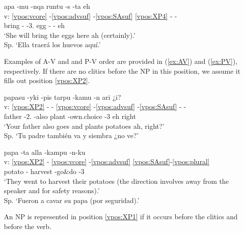 \documentclass[output=paper]{langscibook}
\begin{document}
\ea \label{ex:VP}{
	\glll {} apa -mu -nqa runtu -s -ta eh \\
        v: \ref{vpos:vcore} -\ref{vpos:advsuf} -\ref{vpos:SAsuf} \ref{vpos:XP4} - -  \\
		{} bring -\Dir{} -3\Sg{}.\Fut{} egg -\Pl{} -\Acc{} eh \\
	\glt `She will bring the eggs here ah (certainly).' \\ Sp. `Ella traerá los huevos aquí.'
	\hfill }
\z

Examples of A-V and and P-V order are provided in (\ref{ex:AV}) and (\ref{ex:PV}), respectively. If there are no clitics before the NP in this position, we assume it fills out position \ref{vpos:XP2}. 

\ea \label{ex:AV}{
	\glll {} papasu -yki -pis tarpu -kamu -n ari ¿i? \\
        v: \ref{vpos:XP2} - - \ref{vpos:vcore} -\ref{vpos:advsuf} -\ref{vpos:SAsuf} - - \\
		{} father -2\Sg{}.\Poss{} -also plant -own.choice -3\Sg{} eh right   \\
	\glt `Your father also goes and plants potatoes ah, right?' \\ Sp. `Tu padre también va y siembra ¿no ve?'
	\hfill } 
\z

\ea \label{ex:PV}{
	\glll {} papa -ta alla -kampu -n-ku \\
        v: \ref{vpos:XP2} - \ref{vpos:vcore} -\ref{vpos:advsuf} \ref{vpos:SAsuf}-\ref{vpos:plural} \\
		{} potato -\Acc{} harvest -go\&do -3\Pl{}  \\
	\glt `They went to harvest their potatoes (the direction involves away from the speaker and for safety reasons).' \\ Sp. `Fueron a cavar su papa (por seguridad).' 
	\hfill } 
\z

An NP is represented in position \ref{vpos:XP1} if it occurs before the clitics and before the verb.

\z 
\end{document}
